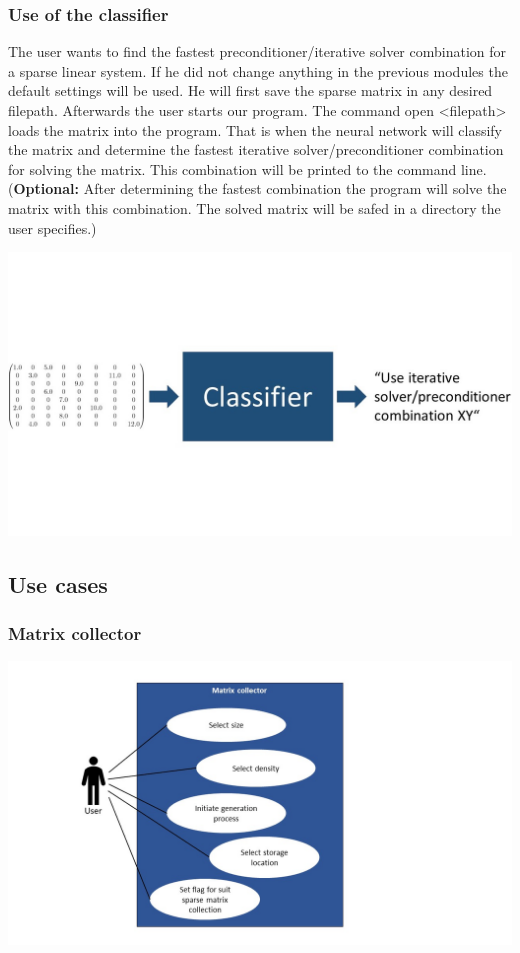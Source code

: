 \documentclass[parskip=full]{scrartcl}
\begin{document}
\subsubsection{Use of the classifier}

The user wants to find the fastest preconditioner/iterative solver combination for a sparse linear system. If he did not change anything in the previous modules the default settings will be used. He will first save the sparse matrix in any desired filepath. Afterwards the user starts our program. The command open <filepath> loads the matrix into the program. That is when the neural network will classify the matrix and determine the fastest iterative solver/preconditioner combination for solving the matrix. This combination will be printed to the command line. (\textbf{Optional:} After determining the fastest combination the program will solve the matrix with this combination. The solved matrix will be safed in a directory the user specifies.)
\begin{center}
\includegraphics[width=\textwidth]{classifier}
\end{center}


\subsection{Use cases}
\subsubsection{Matrix collector}
\includegraphics[width=1.3\textwidth]{useCase_Collector}
\end{document}

